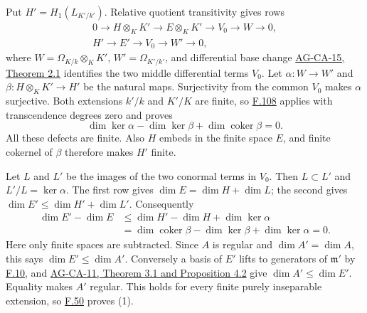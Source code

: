 \documentclass[11pt,a4paper,openany]{report}
\begin{document}
Put \(H'=H_1(L_{K'/k'})\). Relative quotient transitivity gives rows \[\begin{gathered}
0\to H\otimes_K K'\to E\otimes_K K'\to V_0\to W\to0,\\
H'\to E'\to V_0\to W'\to0,
\end{gathered}\] where \(W=\Omega_{K/k}\otimes_K K'\), \(W'=\Omega_{K'/k'}\), and differential base change \href{https://github.com/KokunoYumeto/open-math-courses/blob/d02d0a3669f42579db037cd44de1d113fdd770a1/docs/courses/AG-CA/src/kahler-differentials.md}{AG-CA-15, Theorem 2.1} identifies the two middle differential terms \(V_0\). Let \(\alpha:W\to W'\) and \(\beta:H\otimes_K K'\to H'\) be the natural maps. Surjectivity from the common \(V_0\) makes \(\alpha\) surjective. Both extensions \(k'/k\) and \(K'/K\) are finite, so \hyperref[AG-RG-S05-more-algebra-lemma-gamma-commutative-diagram]{F.108} applies with transcendence degrees zero and proves \[\dim\ker\alpha-\dim\ker\beta+\dim\operatorname{coker}\beta=0.\] All these defects are finite. Also \(H\) embeds in the finite space \(E\), and finite cokernel of \(\beta\) therefore makes \(H'\) finite.

Let \(L\) and \(L'\) be the images of the two conormal terms in \(V_0\). Then \(L\subset L'\) and \(L'/L=\ker\alpha\). The first row gives \(\dim E=\dim H+\dim L\); the second gives \(\dim E'\leq\dim H'+\dim L'\). Consequently \[\begin{aligned}
\dim E'-\dim E
&\leq\dim H'-\dim H+\dim\ker\alpha\\
&=\dim\operatorname{coker}\beta-\dim\ker\beta+\dim\ker\alpha=0.
\end{aligned}\] Here only finite spaces are subtracted. Since \(A\) is regular and \(\dim A'=\dim A\), this says \(\dim E'\leq\dim A'\). Conversely a basis of \(E'\) lifts to generators of \(\mathfrak m'\) by \hyperref[AG-RG-S05-algebra-lemma-NAK]{F.10}, and \href{https://github.com/KokunoYumeto/open-math-courses/blob/d02d0a3669f42579db037cd44de1d113fdd770a1/docs/courses/AG-CA/src/dimension-theory-of-noetherian-local-rings.md}{AG-CA-11, Theorem 3.1 and Proposition 4.2} give \(\dim A'\leq\dim E'\). Equality makes \(A'\) regular. This holds for every finite purely inseparable extension, so \hyperref[AG-RG-S05-algebra-lemma-geometrically-regular]{F.50} proves (1).
\end{document}
